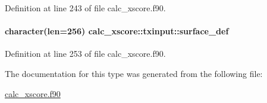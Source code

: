 Definition at line 243 of file calc\-\_\-xscore.\-f90.

\hypertarget{structcalc__xscore_1_1txinput_a0f053dcb02716a4915698e4e197c2695}{
\paragraph[{surface\-\_\-def}]{\setlength{\rightskip}{0pt plus 5cm}character(len=256) calc\-\_\-xscore\-::txinput\-::surface\-\_\-def}}\label{structcalc__xscore_1_1txinput_a0f053dcb02716a4915698e4e197c2695}


Definition at line 253 of file calc\-\_\-xscore.\-f90.



The documentation for this type was generated from the following file\-:\begin{DoxyCompactItemize}
\item 
\hyperlink{calc__xscore_8f90}{calc\-\_\-xscore.\-f90}\end{DoxyCompactItemize}
